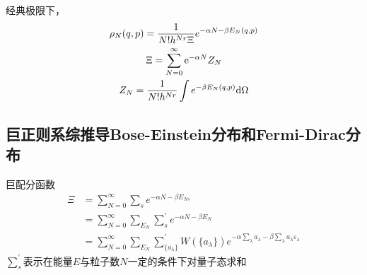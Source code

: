 经典极限下，
\begin{gather*}
    \rho_N(q, p) = \frac{1}{N! h^{Nr} \Xi} e^{-\alpha N - \beta E_N(q, p)}
    \\
    \Xi = \sum_{N=0}^{\infty} \mathrm{e}^{-\alpha N} Z_N
    \\
    Z_N = \frac{1}{N! h^{Nr}} \int e^{-\beta E_N(q, p)} \mathrm{d} \Omega
\end{gather*}

\subsection{巨正则系综推导Bose-Einstein分布和Fermi-Dirac分布}

巨配分函数
\begin{align*}
    \Xi &= \sum_{N=0}^{\infty} \sum_{s} e^{-\alpha N - \beta E_{Ns}}
    \\
    &= \sum_{N=0}^{\infty} \sum_{E_N} \sum_{s}^{'} e^{-\alpha N - \beta E_N}
    \\
    &= \sum_{N=0}^{\infty} \sum_{E_N} \sum_{\{a_{\lambda}\}}^{'} W(\{a_{\lambda}\}) e^{-\alpha \sum_{\lambda} a_{\lambda} - \beta \sum_{\lambda} a_{\lambda} \varepsilon_{\lambda}}
\end{align*}
$\sum_{s}^{'}$表示在能量$E$与粒子数$N$一定的条件下对量子态求和

